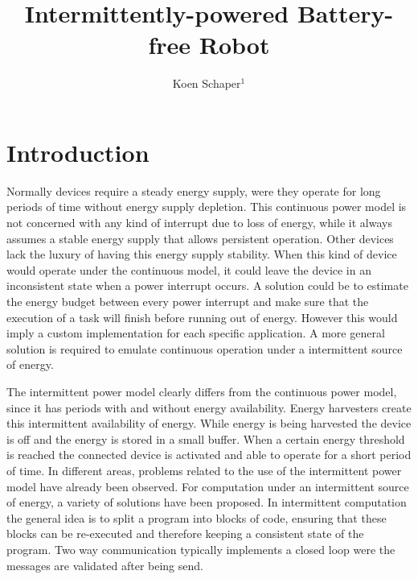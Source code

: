 \documentclass[letterpaper, 10 pt, conference]{ieeeconf}  %
\title{\LARGE \bf
Intermittently-powered Battery-free Robot
}
\author{Koen Schaper$^{1}$ %
}
\begin{document}
\maketitle
\thispagestyle{empty}
\pagestyle{empty}






\section{Introduction}


Normally devices require a steady energy supply, were they operate for long periods of time without energy supply depletion. 
This continuous power model is not concerned with any kind of interrupt due to loss of energy, while it always assumes a stable energy supply that allows persistent operation.
Other devices lack the luxury of having this energy supply stability.
When this kind of device would operate under the continuous model, it could leave the device in an inconsistent state when a power interrupt occurs.
A solution could be to estimate the energy budget between every power interrupt and make sure that the execution of a task will finish before running out of energy.
However this would imply a custom implementation for each specific application. 
A more general solution is required to emulate continuous operation under a intermittent source of energy.

The intermittent power model clearly differs from the continuous power model, since it has periods with and without energy availability.
Energy harvesters create this intermittent availability of energy.
While energy is being harvested the device is off and the energy is stored in a small buffer.
When a certain energy threshold is reached the connected device is activated and able to operate for a short period of time.
In different areas, problems related to the use of the intermittent power model have already been observed.
For computation under an intermittent source of energy, a variety of solutions have been proposed.
In intermittent computation the general idea is to split a program into blocks of code, ensuring that these blocks can be re-executed and therefore keeping a consistent state of the program.
Two way communication typically implements a closed loop were the messages are validated after being send.
\end{document}
